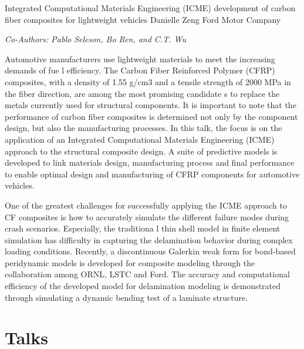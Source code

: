 \documentclass[12pt,letterpaper]{book}
\newenvironment{conf-abstract}[4][]{
 \needspace{10\baselineskip}
 \begin{center}
 { \renewcommand\textsuperscript[1]{}
 \phantomsection\addcontentsline{toc}{section}
 {\texorpdfstring{#2 (\emph{#3})}{#2 (#3)}}
 }
 {{\large\bfseries #2}\marginnote{#1}\par}
 \medskip
 {#3\par}
 \smallskip
 {\small #4\par}
 \end{center}
}{%
 \bigskip
 \hrule
 \bigskip
}
\newcommand{\indexauthors}[1]{%
 \forcsvlist{\index}{#1}
}
\begin{document}
\begin{conf-abstract}[27$^{th}$]
{Integrated Computational Materials Engineering (ICME) development of carbon fiber composites for lightweight vehicles}
{Danielle Zeng}
{Ford Motor Company}
\begin{center}
\textit{Co-Authors: Pablo Seleson, Bo Ren, and C.T. Wu}
\end{center}
Automotive manufacturers use lightweight materials to meet the increasing demands of fue l efficiency. The Carbon Fiber Reinforced Polymer (CFRP) composites, with a density of 1.55 g/cm3 and a tensile strength of 2000 MPa in the fiber direction, are among the most promising candidate s to replace the metals currently used for structural components. It is important to note that the performance of carbon fiber composites is determined not only by the component design, but also the manufacturing processes. In this talk, the focus is on the application of an Integrated Computational Materials Engineering (ICME) approach to the structural composite design. A suite of predictive models is developed to link materials design, manufacturing process and final performance to enable optimal design and manufacturing of CFRP components for automotive vehicles.

One of the greatest challenges for successfully applying the ICME approach to CF composites is how to accurately simulate the different failure modes during crash scenarios. Especially, the traditiona l thin shell model in finite element simulation has difficulty in capturing the delamination behavior during complex loading conditions. Recently, a discontinuous Galerkin weak form for bond-based peridynamic models is developed for composite modeling through the collaboration among ORNL, LSTC and Ford. The accuracy and computational efficiency of the developed model for delamination modeling is demonstrated through simulating a dynamic bending test of a laminate structure.
\end{conf-abstract}


\chapter{Talks}

{
\begin{conf-abstract}[\datum\\\tiny\time]
{\title}
{\first~ \last}
{\affiliation}
\indexauthors{\last~\first}

\newpage
\end{conf-abstract}
}
\end{document}
